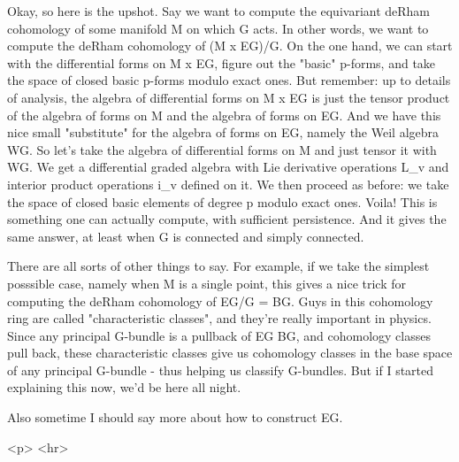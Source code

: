 Okay, so here is the upshot.  Say we want to compute the equivariant
deRham cohomology of some manifold M on which G acts.  In other words,
we want to compute the deRham cohomology of (M x EG)/G.  On the one
hand, we can start with the differential forms on M x EG, figure out the
"basic" p-forms, and take the space of closed basic p-forms
modulo exact ones.  But remember: up to details of analysis, the algebra
of differential forms on M x EG is just the tensor product of the
algebra of forms on M and the algebra of forms on EG.  And we have this
nice small "substitute" for the algebra of forms on EG, namely
the Weil algebra WG.  So let's take the algebra of differential forms on
M and just tensor it with WG.  We get a differential graded algebra with
Lie derivative operations L_{v} and interior product operations 
i_{v}
defined on it.  We then proceed as before: we take the space of closed
basic elements of degree p modulo exact ones.  Voila!  This is something
one can actually compute, with sufficient persistence.  And it gives the
same answer, at least when G is connected and simply connected.

There are all sorts of other things to say.  For example, if we take the
simplest posssible case, namely when M is a single point, this gives a
nice trick for computing the deRham cohomology of EG/G = BG.  Guys in 
this cohomology ring are called "characteristic classes", and they're
really important in physics.  Since any principal G-bundle is a pullback
of EG \to  BG, and cohomology classes pull back, these characteristic
classes give us cohomology classes in the base space of any principal
G-bundle - thus helping us classify G-bundles.  But if I started explaining
this now, we'd be here all night.

Also sometime I should say more about how to construct EG.  


<p> <hr>



